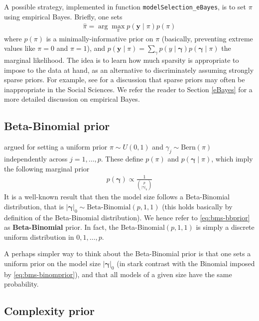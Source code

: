 \documentclass[
]{book}
\newcommand{\bgamma}{\mathbf{\gamma}}
\newcommand{\by}{\mathbf{y}}
\theoremstyle{definition}
\theoremstyle{definition}
\theoremstyle{definition}
\theoremstyle{definition}
\theoremstyle{remark}
\begin{document}
A possible strategy, implemented in function \texttt{modelSelection\_eBayes}, is to set \(\pi\) using empirical Bayes. Briefly, one sets
\begin{align*}
\hat{\pi}= \arg\max_{\pi} p(\by \mid \pi) p(\pi)
\end{align*}
where \(p(\pi)\) is a minimally-informative prior on \(\pi\) (basically, preventing extreme values like \(\pi=0\) and \(\pi=1\)), and \(p(\by \mid \pi)= \sum_{\gamma} p(y \mid \bgamma) p(\bgamma \mid \pi)\) the marginal likelihood.
The idea is to learn how much sparsity is appropriate to impose to the data at hand, as an alternative to discriminately assuming strongly sparse priors.
For example, see \citet{giannone:2021} for a discussion that sparse priors may often be inappropriate in the Social Sciences.
We refer the reader to Section \ref{eBayes} for a more detailed discussion on empirical Bayes.

\subsection{Beta-Binomial prior}\label{beta-binomial-prior}

\citet{scott:2010} argued for setting a uniform prior \(\pi \sim U(0,1)\) and \(\gamma_j \sim \mbox{Bern}(\pi)\) independently across \(j=1,\ldots,p\).
These define \(p(\pi)\) and \(p(\bgamma \mid \pi)\), which imply the following marginal prior
\begin{align}
p(\bgamma) \propto \frac{1}{{p \choose |\bgamma|_0}}
\label{eq:bms-bbprior}
\end{align}
It is a well-known result that then the model size follows a Beta-Binomial distribution, that is \(|\bgamma|_0 \sim \mbox{Beta-Binomial}(p,1,1)\) (this holds basically by definition of the Beta-Binomial distribution).
We hence refer to \eqref{eq:bms-bbprior} as \textbf{Beta-Binomial} prior.
In fact, the Beta-Binomial\((p,1,1)\) is simply a discrete uniform distribution in \(0,1,\ldots,p\).

A perhaps simpler way to think about the Beta-Binomial prior is that one sets a uniform prior on the model size \(|\bgamma|_0\) (in stark contrast with the Binomial imposed by \eqref{eq:bms-binomprior}), and that all models of a given size have the same probability.

\subsection{Complexity prior}\label{complexity-prior}
\end{document}
